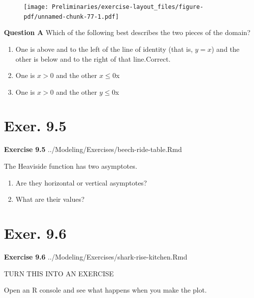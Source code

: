 \documentclass[
  letterpaper,
  DIV=11,
  numbers=noendperiod,
  oneside]{article}
\providecommand{\tightlist}{%
  \setlength{\itemsep}{0pt}\setlength{\parskip}{0pt}}\usepackage{longtable,booktabs,array}
\begin{document}
\begin{multicols}{2}
\begin{figure}[H]

{\centering \texttt{[image: Preliminaries/exercise-layout\_files/figure-pdf/unnamed-chunk-77-1.pdf]}

}

\end{figure}

\textbf{Question A} Which of the following best describes the two pieces
of the domain?

\begin{enumerate}
\def\labelenumi{\roman{enumi}.}
\tightlist
\item
  {One is above and to the left of the line of identity (that is,
  \(y=x\)) and the other is below and to the right of that
  line.{Correct.~}}\\
\item
  {One is \(x > 0\) and the other \(x \leq 0\){x}}\\
\item
  {One is \(x > 0\) and the other \(y \leq 0\){x}}
\end{enumerate}

\hypertarget{exer.-9.5}{%
\section*{Exer. 9.5}\label{exer.-9.5}}

\textbf{Exercise 9.5} ../Modeling/Exercises/beech-ride-table.Rmd

The Heaviside function has two asymptotes.

\begin{enumerate}
\def\labelenumi{\arabic{enumi}.}
\item
  Are they horizontal or vertical asymptotes?
\item
  What are their values?
\end{enumerate}

\hypertarget{exer.-9.6}{%
\section*{Exer. 9.6}\label{exer.-9.6}}

\textbf{Exercise 9.6} ../Modeling/Exercises/shark-rise-kitchen.Rmd

TURN THIS INTO AN EXERCISE

Open an R console and see what happens when you make the plot.


\end{multicols}
\end{document}

